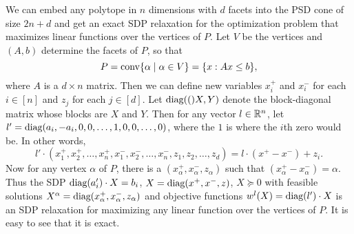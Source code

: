\begin{example}
We can embed any polytope in $n$ dimensions with $d$ facets into the PSD cone of size $2n+d$ and get an exact SDP relaxation for the optimization problem that maximizes linear functions over the vertices of $P$. Let $V$ be the vertices and $(A,b)$ determine the facets of $P$, so that
\[P = \operatorname{conv}\{\alpha \mid \alpha \in V\} = \{x: Ax \leq b\},\]
where $A$ is a $d \times n$ matrix. Then we can define new variables $x_i^+$ and $x_i^-$ for each $i \in [n]$ and $z_j$ for each $j \in [d]$. Let $\text{diag}(()X,Y)$ denote the block-diagonal matrix whose blocks are $X$ and $Y$. Then for any vector $l \in \mathbb R^n$, let $l' = \text{diag}(a_i,-a_i,0,0,\dots,1,0,0,\dots,0)$, where the $1$ is where the $i$th zero would be. In other words,
\[l' \cdot (x_1^+,x_2^+,\dots,x_n^+,x_1^-,x_2^-,\dots,x_n^-,z_1,z_2,\dots,z_d) = l \cdot (x^+ - x^-) + z_i.\]
Now for any vertex $\alpha$ of $P$, there is a $(x_\alpha^+,x_\alpha^-,z_\alpha)$ such that $(x_\alpha^+ - x_\alpha^-) = \alpha$. Thus the SDP $\text{diag}(a_i') \cdot X = b_i$, $X = \text{diag}(x^+,x^-,z)$, $X \succeq 0$ with feasible solutions $X^\alpha = \text{diag}(x_\alpha^+,x_\alpha^-,z_\alpha)$ and objective functions $w^l(X) = \text{diag}(l') \cdot X$ is an SDP relaxation for maximizing any linear function over the vertices of $P$. It is easy to see that it is exact.

\end{example}

